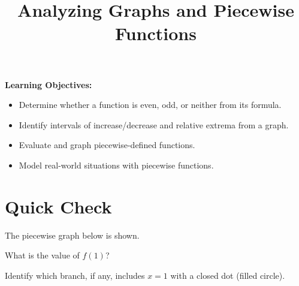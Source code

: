 \documentclass{ximera}
\title{Analyzing Graphs and Piecewise Functions}
\begin{document}
\begin{abstract}
\end{abstract}
\maketitle

\textbf{Learning Objectives:}
\begin{itemize}
  \item Determine whether a function is even, odd, or neither from its formula.
  \item Identify intervals of increase/decrease and relative extrema from a graph.
  \item Evaluate and graph piecewise-defined functions.
  \item Model real-world situations with piecewise functions.
\end{itemize}
\medskip

\section*{Quick Check}

\begin{problem}
The piecewise graph below is shown.

\begin{center}
\end{center}

What is the value of $f(1)$?
\begin{hint}
Identify which branch, if any, includes $x = 1$ with a closed dot (filled circle).
\end{hint}
\begin{multipleChoice}
\end{multipleChoice}
\end{problem}
\end{document}
